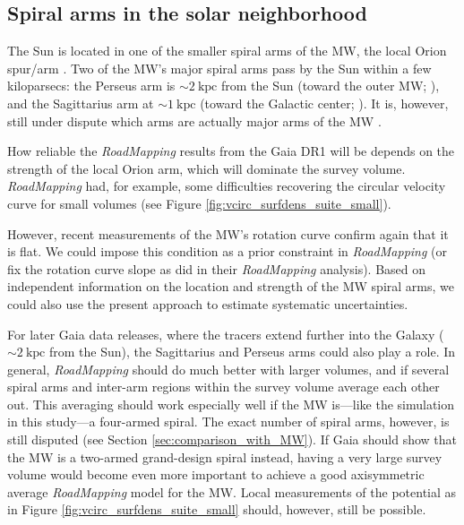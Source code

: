 \documentclass[iop,revtex4,numberedappendix,appendixfloats]{emulateapj}
\newcommand{\RM}{{\sl RoadMapping}}
\begin{document}
\subsection{Spiral arms in the solar neighborhood} \label{sec:discussion_sun_location}

The Sun is located in one of the smaller spiral arms of the MW, the local Orion spur/arm \citep{1953ApJ...118..318M}. Two of the MW's major spiral arms pass by the Sun within a few kiloparsecs: the Perseus arm is $\sim2~\text{kpc}$ from the Sun (toward the outer MW; \citealt{2006Sci...311...54X}), and the Sagittarius arm at $\sim1~\text{kpc}$ (toward the Galactic center; \citealt{2010PASJ...62..287S}). It is, however, still under dispute which arms are actually major arms of the MW \citep{1985IAUS..106..335B,2013ApJ...769...15X,2013ApJ...775...79Z}.

How reliable the \RM{} results from the Gaia DR1 will be depends on the strength of the local Orion arm, which will dominate the survey volume. \RM{} had, for example, some difficulties recovering the circular velocity curve for small volumes (see Figure \ref{fig:vcirc_surfdens_suite_small}).

However, recent measurements of the MW's rotation curve \citep{2012ApJ...759..131B,2014ApJ...783..130R} confirm again that it is flat. We could impose this condition as a prior constraint in \RM{} (or fix the rotation curve slope as \citealt{2013ApJ...779..115B} did in their \RM{} analysis). Based on independent information on the location and strength of the MW spiral arms, we could also use the present approach to estimate systematic uncertainties.

For later Gaia data releases, where the tracers extend further into the Galaxy ($\sim2~\text{kpc}$ from the Sun), the Sagittarius and Perseus arms could also play a role. In general, \RM{} should do much better with larger volumes, and if several spiral arms and inter-arm regions within the survey volume average each other out. This averaging should work especially well if the MW is---like the simulation in this study---a four-armed spiral. The exact number of spiral arms, however, is still disputed (see Section \ref{sec:comparison_with_MW}). If Gaia should show that the MW is a two-armed grand-design spiral instead, having a very large survey volume would become even more important to achieve a good axisymmetric average \RM{} model for the MW. Local measurements of the potential as in Figure \ref{fig:vcirc_surfdens_suite_small} should, however, still be possible.
\end{document}
